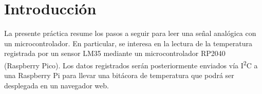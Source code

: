 %
%


\section{Introducción}%
\label{sec:introduction}
La presente práctica resume los pasos a seguir para leer una señal analógica con un microcontrolador.
En particular, se interesa en la lectura de la temperatura registrada por un sensor LM35 mediante un microcontrolador RP2040 (Raspberry Pico).
Los datos registrados serán posteriormente enviados vía I\textsuperscript{2}C a una Raspberry Pi para llevar una bitácora de temperatura que podrá ser desplegada en un navegador web.



\newpage

